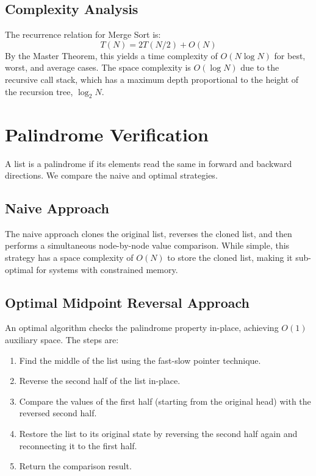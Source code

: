 \documentclass[10pt,journal,compsoc,onecolumn]{IEEEtran}
\begin{document}
\subsection{Complexity Analysis}
The recurrence relation for Merge Sort is:
\begin{equation}
T(N) = 2T(N/2) + O(N)
\end{equation}
By the Master Theorem, this yields a time complexity of $O(N \log N)$ for best, worst, and average cases. The space complexity is $O(\log N)$ due to the recursive call stack, which has a maximum depth proportional to the height of the recursion tree, $\log_2 N$.

\section{Palindrome Verification}
\label{sec:palindrome}
A list is a palindrome if its elements read the same in forward and backward directions. We compare the naive and optimal strategies.

\subsection{Naive Approach}
The naive approach clones the original list, reverses the cloned list, and then performs a simultaneous node-by-node value comparison.
While simple, this strategy has a space complexity of $O(N)$ to store the cloned list, making it sub-optimal for systems with constrained memory.

\subsection{Optimal Midpoint Reversal Approach}
An optimal algorithm checks the palindrome property in-place, achieving $O(1)$ auxiliary space. The steps are:
\begin{enumerate}
    \item Find the middle of the list using the fast-slow pointer technique.
    \item Reverse the second half of the list in-place.
    \item Compare the values of the first half (starting from the original head) with the reversed second half.
    \item Restore the list to its original state by reversing the second half again and reconnecting it to the first half.
    \item Return the comparison result.
\end{enumerate}
\end{document}
